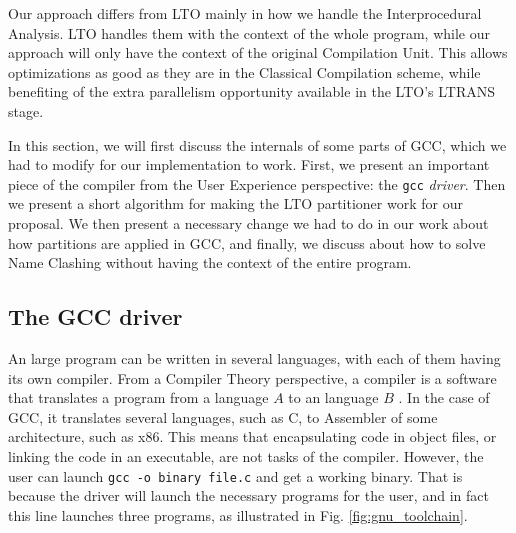 \documentclass[runningheads]{llncs}
\begin{document}
Our approach differs from LTO mainly in how we handle the Interprocedural
Analysis. LTO handles them with the context of the whole program, while
our approach will only have the context of the original Compilation Unit.
This allows optimizations as good as they are in the Classical
Compilation scheme, while benefiting of the extra parallelism opportunity
available in the LTO's LTRANS stage.

In this section, we will first discuss the internals of some parts of
GCC, which we had to modify for our implementation to work. First,
we present an important piece of the compiler from the User Experience perspective:
the \texttt{gcc} \textit{driver}.
Then we present a short algorithm for making the LTO partitioner
work for our proposal. We then present a necessary change we had to do
in our work about how partitions are applied in GCC, and finally, we
discuss about how to solve Name Clashing without having the context of the
entire program.

\subsection{The GCC driver}

An large program can be written in several languages, with each of them having
its own compiler. From a Compiler Theory perspective, a compiler is a software
that translates a program from a language $A$ to an language $B$
\cite{dragonbook}.  In the case of GCC, it translates several languages, such
as C, to Assembler of some architecture, such as x86. This means that
encapsulating code in object files, or linking the code in an executable, are
not tasks of the compiler. However, the user can launch \texttt{gcc -o binary
file.c} and get a working binary. That is because the driver will launch the
necessary programs for the user, and in fact this line launches three programs,
as illustrated in Fig. \ref{fig:gnu_toolchain}.
\end{document}
